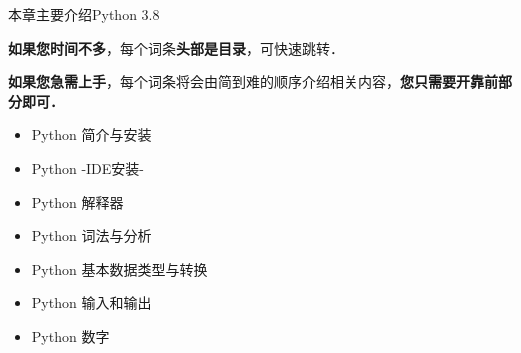 
\begin{issues}
\issueTODO
\end{issues}

本章主要介绍Python 3.8

\textbf{如果您时间不多}，每个词条\textbf{头部是目录}，可快速跳转．

\textbf{如果您急需上手}，每个词条将会由简到难的顺序介绍相关内容，\textbf{您只需要开靠前部分即可．}

\begin{itemize}
\item Python 简介与安装
\item Python -IDE安装-
\item Python 解释器
\item Python 词法与分析
\item Python 基本数据类型与转换
\item Python 输入和输出
\item Python 数字
\end{itemize}
